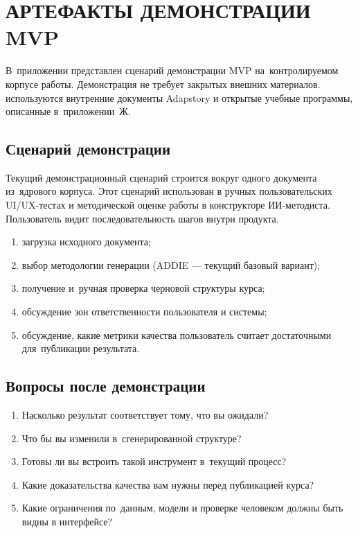 \chapter{АРТЕФАКТЫ ДЕМОНСТРАЦИИ MVP}

В~приложении представлен сценарий демонстрации MVP на~контролируемом
корпусе работы. Демонстрация не требует закрытых внешних материалов.
используются внутренние документы Adapstory и открытые учебные
программы, описанные в~приложении~Ж.

\section*{Сценарий демонстрации}

Текущий демонстрационный сценарий строится вокруг одного документа
из~ядрового корпуса. Этот сценарий использован в ручных пользовательских
UI/UX-тестах и методической оценке работы в конструкторе ИИ-методиста.
Пользователь видит последовательность шагов внутри продукта.

\begin{enumerate}
  \item загрузка исходного документа;
  \item выбор методологии генерации (ADDIE — текущий базовый вариант);
  \item получение и~ручная проверка черновой структуры курса;
  \item обсуждение зон ответственности пользователя и системы;
  \item обсуждение, какие метрики качества пользователь считает
    достаточными для~публикации результата.
\end{enumerate}

\section*{Вопросы после демонстрации}

\begin{enumerate}
  \item Насколько результат соответствует тому, что вы ожидали?
  \item Что бы вы изменили в~сгенерированной структуре?
  \item Готовы ли вы встроить такой инструмент в~текущий процесс?
  \item Какие доказательства качества вам нужны перед публикацией курса?
  \item Какие ограничения по~данным, модели и проверке человеком должны быть
    видны в интерфейсе?
\end{enumerate}

